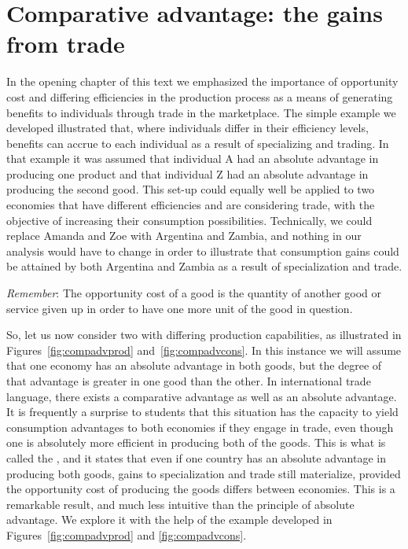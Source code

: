 \section{Comparative advantage: the gains from trade}\label{sec:ch15sec3}

In the opening chapter of this text we emphasized the importance of opportunity cost and differing efficiencies in the production process as a means of generating benefits to individuals through trade in the marketplace. The simple example we developed illustrated that, where individuals differ in their efficiency levels, benefits can accrue to each individual as a result of specializing and trading. In that example it was assumed that individual A had an absolute advantage in producing one product and that individual Z had an absolute advantage in producing the second good. This set-up could equally well be applied to two economies that have different efficiencies and are considering trade, with the objective of increasing their consumption possibilities. Technically, we could replace Amanda and Zoe with Argentina and Zambia, and nothing in our analysis would have to change in order to illustrate that consumption gains could be attained by both Argentina and Zambia as a result of specialization and trade. 

\textit{Remember}: The opportunity cost of a good is the quantity of another good or service given up in order to have one more unit of the good in question. 

So, let us now consider two  with differing production capabilities, as illustrated in Figures~\ref{fig:compadvprod} and~\ref{fig:compadvcons}. In this instance we will assume that one economy has an absolute advantage in both goods, but the degree of that advantage is greater in one good than the other. In international trade language, there exists a comparative advantage as well as an absolute advantage. It is frequently a surprise to students that this situation has the capacity to yield consumption advantages to both economies if they engage in trade, even though one is absolutely more efficient in producing both of the goods. This is what is called the , and it states that even if one country has an absolute advantage in producing both goods, gains to specialization and trade still materialize, provided the opportunity cost of producing the goods differs between economies. This is a remarkable result, and much less intuitive than the principle of absolute advantage. We explore it with the help of the example developed in Figures~\ref{fig:compadvprod} and \ref{fig:compadvcons}.

